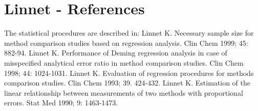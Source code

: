 \documentclass[12pt, a4paper]{report}
\theoremstyle{plain}
\theoremstyle{definition}
\theoremstyle{remark}
\begin{document}



\section{Linnet - References}
The statistical procedures are described in:
Linnet K. Necessary sample size for method comparison studies based on regression analysis. Clin Chem 1999; 45: 882-94.
Linnet K. Performance of Deming regression analysis in case of misspecified analytical error ratio in method comparison studies. Clin Chem 1998; 44: 1024-1031.
Linnet K. Evaluation of regression procedures for methods comparison studies. Clin Chem 1993; 39. 424-432.
Linnet K. Estimation of the linear relationship between measurements of two methods with proportional errors. Stat Med 1990; 9: 1463-1473.





\end{document}
